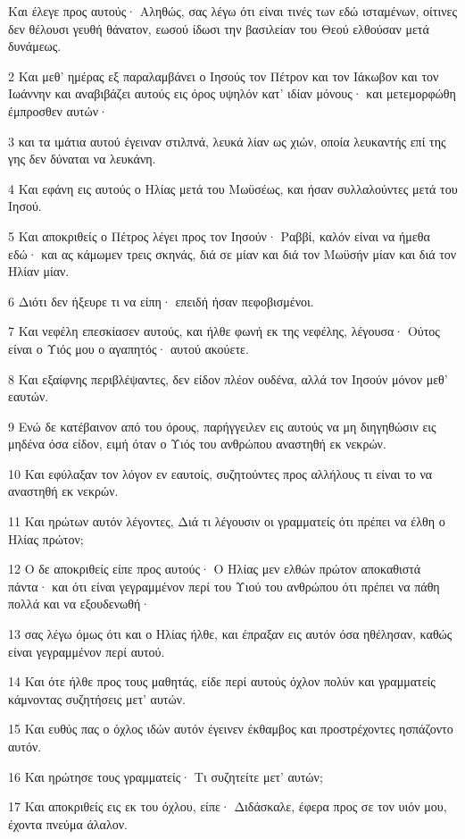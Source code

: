 \par Και έλεγε προς αυτούς· Αληθώς, σας λέγω ότι είναι τινές των εδώ ισταμένων, οίτινες δεν θέλουσι γευθή θάνατον, εωσού ίδωσι την βασιλείαν του Θεού ελθούσαν μετά δυνάμεως.
\par 2 Και μεθ' ημέρας εξ παραλαμβάνει ο Ιησούς τον Πέτρον και τον Ιάκωβον και τον Ιωάννην και αναβιβάζει αυτούς εις όρος υψηλόν κατ' ιδίαν μόνους· και μετεμορφώθη έμπροσθεν αυτών·
\par 3 και τα ιμάτια αυτού έγειναν στιλπνά, λευκά λίαν ως χιών, οποία λευκαντής επί της γης δεν δύναται να λευκάνη.
\par 4 Και εφάνη εις αυτούς ο Ηλίας μετά του Μωϋσέως, και ήσαν συλλαλούντες μετά του Ιησού.
\par 5 Και αποκριθείς ο Πέτρος λέγει προς τον Ιησούν· Ραββί, καλόν είναι να ήμεθα εδώ· και ας κάμωμεν τρεις σκηνάς, διά σε μίαν και διά τον Μωϋσήν μίαν και διά τον Ηλίαν μίαν.
\par 6 Διότι δεν ήξευρε τι να είπη· επειδή ήσαν πεφοβισμένοι.
\par 7 Και νεφέλη επεσκίασεν αυτούς, και ήλθε φωνή εκ της νεφέλης, λέγουσα· Ούτος είναι ο Υιός μου ο αγαπητός· αυτού ακούετε.
\par 8 Και εξαίφνης περιβλέψαντες, δεν είδον πλέον ουδένα, αλλά τον Ιησούν μόνον μεθ' εαυτών.
\par 9 Ενώ δε κατέβαινον από του όρους, παρήγγειλεν εις αυτούς να μη διηγηθώσιν εις μηδένα όσα είδον, ειμή όταν ο Υιός του ανθρώπου αναστηθή εκ νεκρών.
\par 10 Και εφύλαξαν τον λόγον εν εαυτοίς, συζητούντες προς αλλήλους τι είναι το να αναστηθή εκ νεκρών.
\par 11 Και ηρώτων αυτόν λέγοντες, Διά τι λέγουσιν οι γραμματείς ότι πρέπει να έλθη ο Ηλίας πρώτον;
\par 12 Ο δε αποκριθείς είπε προς αυτούς· Ο Ηλίας μεν ελθών πρώτον αποκαθιστά πάντα· και ότι είναι γεγραμμένον περί του Υιού του ανθρώπου ότι πρέπει να πάθη πολλά και να εξουδενωθή·
\par 13 σας λέγω όμως ότι και ο Ηλίας ήλθε, και έπραξαν εις αυτόν όσα ηθέλησαν, καθώς είναι γεγραμμένον περί αυτού.
\par 14 Και ότε ήλθε προς τους μαθητάς, είδε περί αυτούς όχλον πολύν και γραμματείς κάμνοντας συζητήσεις μετ' αυτών.
\par 15 Και ευθύς πας ο όχλος ιδών αυτόν έγεινεν έκθαμβος και προστρέχοντες ησπάζοντο αυτόν.
\par 16 Και ηρώτησε τους γραμματείς· Τι συζητείτε μετ' αυτών;
\par 17 Και αποκριθείς εις εκ του όχλου, είπε· Διδάσκαλε, έφερα προς σε τον υιόν μου, έχοντα πνεύμα άλαλον.
